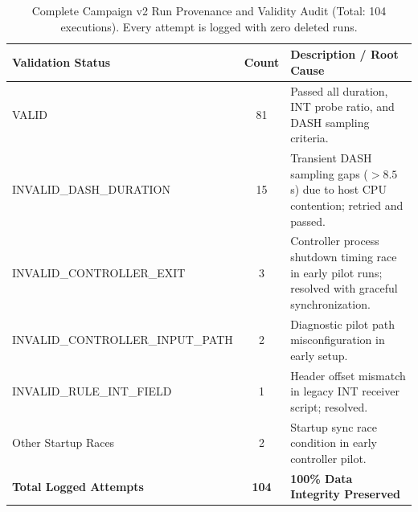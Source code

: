 \begin{table}[t]
\centering
\caption{Complete Campaign v2 Run Provenance and Validity Audit (Total: 104 executions). Every attempt is logged with zero deleted runs.}
\label{tab:validity_audit}
\small
\begin{tabular}{lcp{6.5cm}}
\toprule
\textbf{Validation Status} & \textbf{Count} & \textbf{Description / Root Cause} \\
\midrule
VALID & 81 & Passed all duration, INT probe ratio, and DASH sampling criteria. \\
INVALID\_DASH\_DURATION & 15 & Transient DASH sampling gaps ($>8.5$\,s) due to host CPU contention; retried and passed. \\
INVALID\_CONTROLLER\_EXIT & 3 & Controller process shutdown timing race in early pilot runs; resolved with graceful synchronization. \\
INVALID\_CONTROLLER\_INPUT\_PATH & 2 & Diagnostic pilot path misconfiguration in early setup. \\
INVALID\_RULE\_INT\_FIELD & 1 & Header offset mismatch in legacy INT receiver script; resolved. \\
Other Startup Races & 2 & Startup sync race condition in early controller pilot. \\
\midrule
\textbf{Total Logged Attempts} & \textbf{104} & \textbf{100\% Data Integrity Preserved} \\
\bottomrule
\end{tabular}
\end{table}